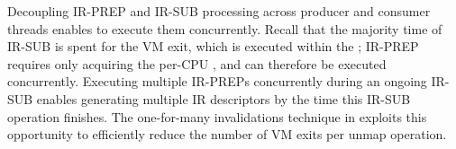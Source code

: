 






Decoupling IR-PREP and IR-SUB processing across producer and consumer threads enables 
    {\vfreename} to execute them concurrently. 
Recall that the majority time of IR-SUB 
    is spent for the VM exit, 
    which is executed within the ; 
IR-PREP requires only acquiring the per-CPU , and can therefore be executed concurrently. 
Executing multiple IR-PREPs concurrently during an ongoing IR-SUB enables generating multiple IR descriptors 
    by the time this IR-SUB operation finishes. 
The one-for-many invalidations technique in {\vfreename} exploits this opportunity 
    to efficiently reduce the number of VM exits per unmap operation.

    

